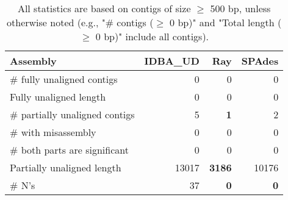 \documentclass[12pt,a4paper]{article}
\begin{document}
\begin{table}[ht]
\begin{center}
\caption{All statistics are based on contigs of size $\geq$ 500 bp, unless otherwise noted (e.g., "\# contigs ($\geq$ 0 bp)" and "Total length ($\geq$ 0 bp)" include all contigs).}
\begin{tabular}{|l*{3}{|r}|}
\hline
Assembly & IDBA\_UD & Ray & SPAdes \\ \hline
\# fully unaligned contigs & 0 & 0 & 0 \\ \hline
Fully unaligned length & 0 & 0 & 0 \\ \hline
\# partially unaligned contigs & 5 & {\bf 1} & 2 \\ \hline
\hspace{5mm}\# with misassembly & 0 & 0 & 0 \\ \hline
\hspace{5mm}\# both parts are significant & 0 & 0 & 0 \\ \hline
Partially unaligned length & 13017 & {\bf 3186} & 10176 \\ \hline
\# N's & 37 & {\bf 0} & {\bf 0} \\ \hline
\end{tabular}
\end{center}
\end{table}
\end{document}
